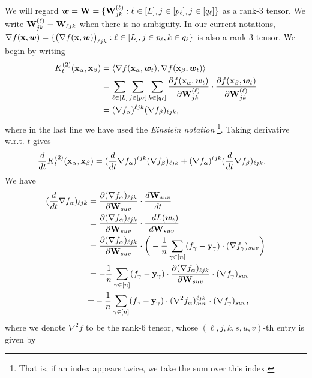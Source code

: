 We will regard ${\boldsymbol{w}} = {\mathbf{W}}  = \{{\mathbf{W}} ^{(\ell)}_{j k }: \ell\in[L], j\in[p_\ell], j \in [q_\ell]\}$ as a rank-$3$ tensor. 
We write ${\mathbf{W}}^{{}(\ell)}_{jk}\equiv {\mathbf{W}} _{\ell jk}$ when there is no ambiguity. 
In our current notations, $\nabla f({\mathbf{x}}, {\boldsymbol{w}}) = \{\bigl(\nabla f({\mathbf{x}}, {\boldsymbol{w}})\bigr)_{\ell j k}: \ell\in[L], j\in p_\ell, k\in q_\ell\}$ is also a rank-$3$ tensor. We begin by writing
\begin{align*}
	{K}^{(2)}_t({\mathbf{x}}_\alpha, {\mathbf{x}}_\beta) & = \langle \nabla f({\mathbf{x}}_\alpha, {\boldsymbol{w}}_t) , \nabla f({\mathbf{x}}_\beta, {\boldsymbol{w}}_t)\rangle \\
	& = \sum_{\ell\in[L]} \sum_{j\in[p_\ell]} \sum_{k\in[q_\ell]} \frac{\partial f({\mathbf{x}}_\alpha, {\boldsymbol{w}}_t)}{\partial {\mathbf{W}}^{{}(\ell)}_{j k}} \cdot \frac{\partial f({\mathbf{x}}_\beta, {\boldsymbol{w}}_t)}{\partial {\mathbf{W}}^{{}(\ell)}_{j k}} \\
	& = (\nabla f_\alpha)^{\ell j k } (\nabla f_\beta)_{\ell j k},
\end{align*}
where in the last line we have used the \emph{Einstein notation} \footnote{That is, if an index appears twice, we take the sum over this index.}. Taking derivative w.r.t. $t$ gives
\begin{align*}
	\frac{d}{dt}{K}^{(2)}_t({\mathbf{x}}_\alpha, {\mathbf{x}}_\beta) & =  (\frac{d}{dt} \nabla f_\alpha)^{\ell j k } (\nabla f_\beta)_{\ell j k} + (\nabla f_\alpha)^{\ell j k } (\frac{d}{dt} \nabla f_\beta)_{\ell j k}.
\end{align*}
We have
\begin{align*}
	 (\frac{d}{dt} \nabla f_\alpha)_{\ell j k } & = \frac{\partial (\nabla f_\alpha)_{\ell j k }}{\partial \rmW _{suv}}  \cdot \frac{d \rmW _{suv}}{dt} \\
	 & = \frac{\partial (\nabla f_\alpha)_{\ell j k }}{\partial \rmW _{suv}}  \cdot %
	 {\frac{-d L(\rvtheta_t)}{d \rmW _{suv}}} \\
	 & = \frac{\partial (\nabla f_\alpha)_{\ell j k }}{\partial \rmW _{suv}} \cdot \bigg(-\frac{1}{n} \sum_{\gamma\in[n]} (f_\gamma - \rvy_\gamma) \cdot (\nabla f_\gamma)_{suv} \bigg) \\
	 & = -\frac{1}{n} \sum_{\gamma\in[n]} (f_\gamma- \rvy_\gamma) \cdot  \frac{\partial (\nabla f_\alpha)_{\ell j k }}{\partial \rmW _{suv}} \cdot (\nabla f_\gamma)_{suv} \\
	 &{=} -\frac{1}{n} \sum_{\gamma\in[n]} (f_\gamma- \rvy_\gamma) \cdot (\nabla^2 f_\alpha)^{\ell j k}_{suv} \cdot (\nabla f_\gamma)_{suv},
\end{align*}
where we denote $\nabla^2 f$ to be the rank-$6$ tensor, whose $(\ell, j, k, s, u, v)$-th entry is given by 
